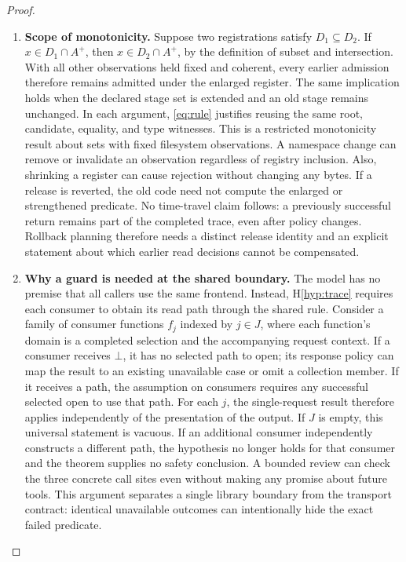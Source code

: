 \documentclass[12pt]{article}
\newcommand{\denied}{\bot}
\begin{document}
\begin{proof}
\begin{enumerate}
\item \textbf{Scope of monotonicity.}
Suppose two registrations satisfy $D_1\subseteq D_2$.
If $x\in D_1\cap A^+$, then $x\in D_2\cap A^+$, by the
definition of subset and intersection. With all other
observations held fixed and coherent, every earlier
admission therefore remains admitted under the enlarged
register. The same implication holds when the declared
stage set is extended and an old stage remains unchanged.
In each argument, \eqref{eq:rule} justifies reusing the
same root, candidate, equality, and type witnesses.
This is a restricted monotonicity result about sets
with fixed filesystem observations. A namespace change
can remove or invalidate an observation regardless of
registry inclusion. Also, shrinking a register can
cause rejection without changing any bytes.
If a release is reverted, the old code need not compute
the enlarged or strengthened predicate. No time-travel
claim follows: a previously successful return remains
part of the completed trace, even after policy changes.
Rollback planning therefore needs a distinct release
identity and an explicit statement about which earlier
read decisions cannot be compensated.

\item \textbf{Why a guard is needed at the shared boundary.}
The model has no premise that all callers use the same
frontend. Instead, H\ref{hyp:trace} requires each consumer
to obtain its read path through the shared rule. Consider
a family of consumer functions $f_j$ indexed by $j\in J$,
where each function's domain is a completed selection
and the accompanying request context.
If a consumer receives $\denied$, it has no selected
path to open; its response policy can map the result to
an existing unavailable case or omit a collection member.
If it receives a path, the assumption on consumers
requires any successful selected open to use that path.
For each $j$, the single-request result therefore applies
independently of the presentation of the output.
If $J$ is empty, this universal statement is vacuous.
If an additional consumer independently constructs a
different path, the hypothesis no longer holds for that
consumer and the theorem supplies no safety conclusion.
A bounded review can check the three concrete call sites
even without making any promise about future tools.
This argument separates a single library boundary from
the transport contract: identical unavailable outcomes
can intentionally hide the exact failed predicate.


\end{enumerate}
\end{proof}
\end{document}
